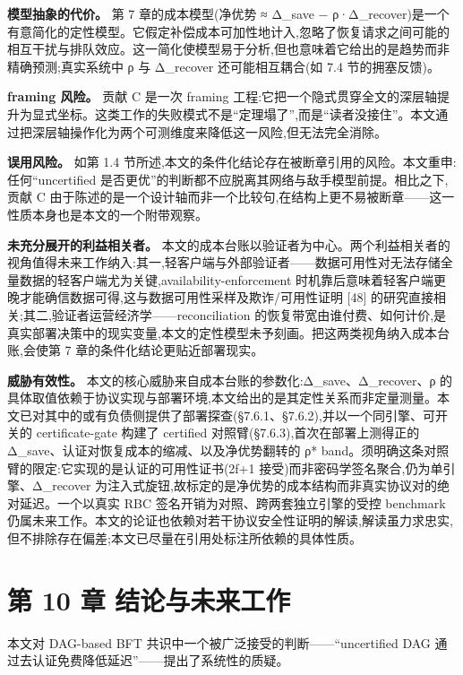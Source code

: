 \documentclass[UTF8,fontset=windows,a4paper,11pt]{ctexart}
\begin{document}
\textbf{模型抽象的代价。} 第 7 章的成本模型(净优势 ≈ Δ\_save −
ρ·Δ\_recover)是一个有意简化的定性模型。它假定补偿成本可加性地计入,忽略了恢复请求之间可能的相互干扰与排队效应。这一简化使模型易于分析,但也意味着它给出的是趋势而非精确预测;真实系统中
ρ 与 Δ\_recover 还可能相互耦合(如 7.4 节的拥塞反馈)。

\textbf{framing 风险。} 贡献 C 是一次 framing
工程:它把一个隐式贯穿全文的深层轴提升为显式坐标。这类工作的失败模式不是``定理塌了'',而是``读者没接住''。本文通过把深层轴操作化为两个可测维度来降低这一风险,但无法完全消除。

\textbf{误用风险。} 如第 1.4
节所述,本文的条件化结论存在被断章引用的风险。本文重申:任何``uncertified
是否更优''的判断都不应脱离其网络与敌手模型前提。相比之下,贡献 C
由于陈述的是一个设计轴而非一个比较句,在结构上更不易被断章------这一性质本身也是本文的一个附带观察。

\textbf{未充分展开的利益相关者。}
本文的成本台账以验证者为中心。两个利益相关者的视角值得未来工作纳入:其一,轻客户端与外部验证者------数据可用性对无法存储全量数据的轻客户端尤为关键,availability-enforcement
时机靠后意味着轻客户端更晚才能确信数据可得,这与数据可用性采样及欺诈/可用性证明
{[}48{]} 的研究直接相关;其二,验证者运营经济学------reconciliation
的恢复带宽由谁付费、如何计价,是真实部署决策中的现实变量,本文的定性模型未予刻画。把这两类视角纳入成本台账,会使第
7 章的条件化结论更贴近部署现实。

\textbf{威胁有效性。}
本文的核心威胁来自成本台账的参数化:Δ\_save、Δ\_recover、ρ
的具体取值依赖于协议实现与部署环境,本文给出的是其定性关系而非定量测量。本文已对其中的或有负债侧提供了部署探查(§7.6.1、§7.6.2),并以一个同引擎、可开关的
certificate-gate 构建了 certified 对照臂(§7.6.3),首次在部署上测得正的
Δ\_save、认证对恢复成本的缩减、以及净优势翻转的 ρ*
band。须明确这条对照臂的限定:它实现的是认证的可用性证书(2f+1
接受)而非密码学签名聚合,仍为单引擎、Δ\_recover
为注入式旋钮,故标定的是净优势的成本结构而非真实协议对的绝对延迟。一个以真实
RBC 签名开销为对照、跨两套独立引擎的受控 benchmark
仍属未来工作。本文的论证也依赖对若干协议安全性证明的解读,解读虽力求忠实,但不排除存在偏差;本文已尽量在引用处标注所依赖的具体性质。

\section{第 10 章
结论与未来工作}\label{ux7b2c-10-ux7ae0-ux7ed3ux8bbaux4e0eux672aux6765ux5de5ux4f5c}

本文对 DAG-based BFT 共识中一个被广泛接受的判断------``uncertified DAG
通过去认证免费降低延迟''------提出了系统性的质疑。
\end{document}
